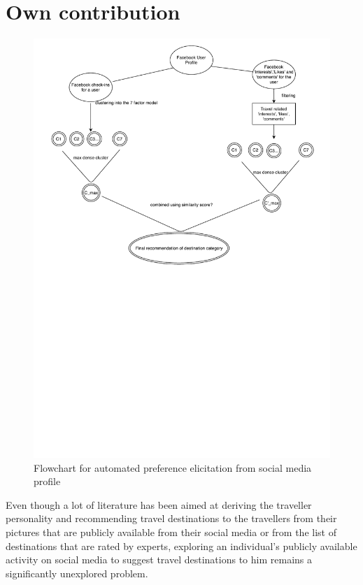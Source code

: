 \section{Own contribution}
\begin{figure}
  \includegraphics[width=\linewidth]{latex_files/figures/seminar_own_contri.pdf}
  \caption{Flowchart for automated preference elicitation from social media profile}
  \label{fig:table3}
\end{figure}

Even though a lot of literature has been aimed at deriving the traveller personality and recommending travel destinations to the travellers from their pictures that are publicly available from their social media or from the list of destinations that are rated by experts, exploring an individual's publicly available activity on social media to suggest travel destinations to him remains a significantly unexplored problem.

